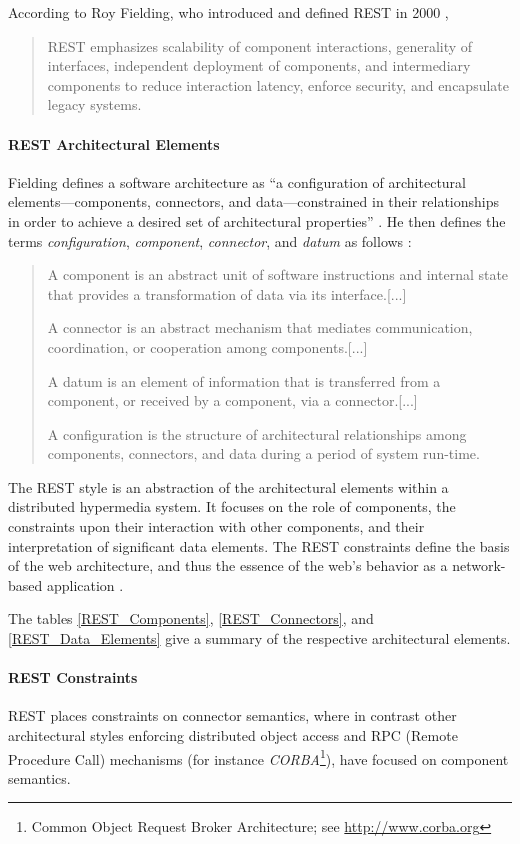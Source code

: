 According to Roy Fielding, who introduced and defined REST in 2000 \cite[p.~xvii]{Fie00},
\begin{quote}
REST emphasizes scalability of component interactions, generality of interfaces, independent deployment of components, and intermediary components to reduce interaction latency, enforce security, and encapsulate legacy systems.
\end{quote}

\paragraph{REST Architectural Elements}
Fielding defines a software architecture as ``a configuration of architectural elements---components, connectors, and data---constrained in their relationships in order to achieve a desired set of architectural properties'' \cite[p.~7]{Fie00}. He then defines the terms \emph{configuration}, \emph{component}, \emph{connector}, and \emph{datum} as follows \cite[p.~10ff]{Fie00}:
\begin{quote}
    A component is an abstract unit of software instructions and internal state that provides a transformation of data via its interface.[...]

    A connector is an abstract mechanism that mediates communication, coordination, or cooperation among components.[...]

    A datum is an element of information that is transferred from a component, or received by a component, via a connector.[...]

    A configuration is the structure of architectural relationships among components, connectors, and data during a period of system run-time.
\end{quote}




The REST style is an abstraction of the architectural elements within a distributed hypermedia system. It focuses on the role of components, the constraints upon their interaction with other components, and their interpretation of significant data elements. The REST constraints define the basis of the web architecture, and thus the essence of the web's behavior as a network-based application \cite[p.~86]{Fie00}.

The tables \ref{REST_Components}, \ref{REST_Connectors}, and \ref{REST_Data_Elements} give a summary of the respective architectural elements.

\paragraph{REST Constraints}
REST places constraints on connector semantics, where in contrast other architectural styles enforcing distributed object access and RPC (Remote Procedure Call) mechanisms (for instance \emph{CORBA}\footnote{Common Object Request Broker Architecture; see \url{http://www.corba.org}}), have focused on component semantics.

